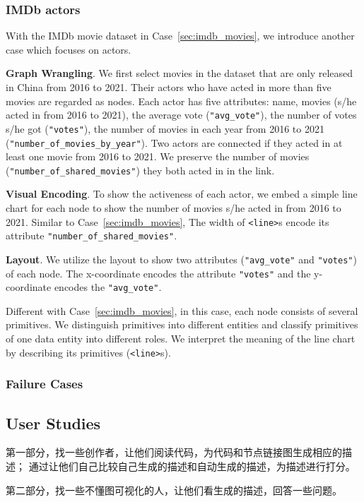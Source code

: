 \subsubsection{IMDb actors}
With the IMDb movie dataset in Case~\ref{sec:imdb_movies}, we introduce another case which focuses on actors.

\textbf{Graph Wrangling}. We first select movies in the dataset that are only released in China from 2016 to 2021.
Their actors who have acted in more than five movies are regarded as nodes.
Each actor has five attributes: name, movies (s/he acted in from 2016 to 2021), the average vote (\texttt{"avg\_vote"}), the number of votes s/he got (\texttt{"votes"}), the number of movies in each year from 2016 to 2021 (\texttt{"number\_of\_movies\_by\_year"}).
Two actors are connected if they acted in at least one movie from 2016 to 2021.
We preserve the number of movies (\texttt{"number\_of\_shared\_movies"}) they both acted in in the link.

\textbf{Visual Encoding}. To show the activeness of each actor, we embed a simple line chart for each node to show the number of movies s/he acted in from 2016 to 2021. Similar to Case~\ref{sec:imdb_movies}, The width of \texttt{<line>}s encode its attribute \texttt{"number\_of\_shared\_movies"}.

\textbf{Layout}. We utilize the layout to show two attributes (\texttt{"avg\_vote"} and \texttt{"votes"}) of each node. The x-coordinate encodes the attribute \texttt{"votes"} and the y-coordinate encodes the \texttt{"avg\_vote"}.

Different with Case~\ref{sec:imdb_movies}, in this case, each node consists of several primitives.
We distinguish primitives into different entities and classify primitives of one data entity into different roles.
We interpret the meaning of the line chart by describing its primitives (\texttt{<line>}s).

\subsubsection{}

\subsubsection{Failure Cases}

\subsection{User Studies}
第一部分，找一些创作者，让他们阅读代码，为代码和节点链接图生成相应的描述；
通过让他们自己比较自己生成的描述和自动生成的描述，为描述进行打分。

第二部分，找一些不懂图可视化的人，让他们看生成的描述，回答一些问题。